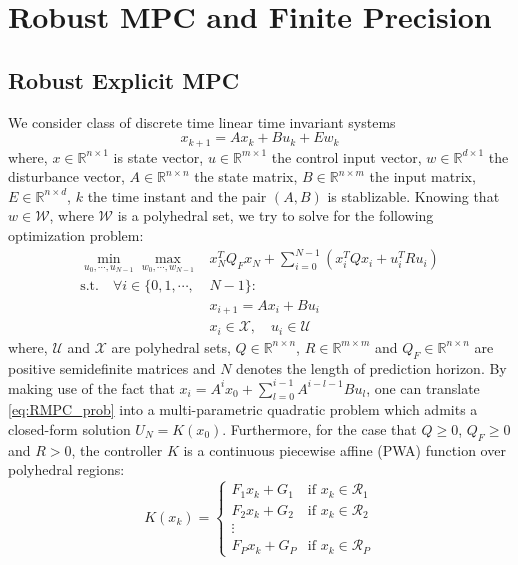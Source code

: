 \section{Robust MPC and Finite Precision}
\subsection{Robust Explicit MPC}
\def\reals{\mathbb{R}}
We consider class of discrete time linear time invariant systems
\begin{equation}
\label{eq:DSS}
x_{k+1}=Ax_k+Bu_k+Ew_k
\end{equation}
where, $x\in \reals^{n\times 1}$ is state vector, $u\in \reals^{m\times 1}$ the control input vector, $w\in \reals^{d\times 1}$ the disturbance vector, $A\in \reals^{n\times n}$ the state matrix, $B\in \reals^{n\times m}$ the input matrix, $E\in \reals^{n\times d}$, $k$ the time instant and the pair $(A,B)$ is stablizable. Knowing that $w\in\mathcal{W}$, where $\mathcal{W}$ is a polyhedral set, we try to solve for the following optimization problem:
\begin{align}
\label{eq:RMPC_prob}
\min_{u_0,\cdots,u_{N-1}}\max_{w_0,\cdots,w_{N-1}}& x_N^TQ_Fx_N+\sum_{i=0}^{N-1}(x_i^TQx_i+u_i^TRu_i)\nonumber\\
\text{s.t.}\quad\forall i\in\{0,1,\cdots,&N-1\}:\nonumber\\
&x_{i+1}=Ax_i+Bu_i\nonumber\\
&x_i\in\mathcal{X},\quad u_i\in \mathcal{U}	
\end{align}
where, $\mathcal U$ and $\mathcal X$ are polyhedral sets, $Q\in\reals^{n\times n}$, $R\in\reals^{m\times m}$ and $Q_F\in\reals^{n\times n}$ are positive semidefinite matrices and $N$ denotes the length of prediction horizon. By making use of the fact that $x_i=A^ix_0+\sum_{l=0}^{i-1}A^{i-l-1}Bu_l$, one can translate \eqref{eq:RMPC_prob} into a multi-parametric quadratic problem which admits a closed-form solution $U_N=K(x_0)$. Furthermore, for the case that $Q\geq0$, $Q_F\geq0$ and $R>0$, the controller $K$ is a continuous piecewise affine (PWA) function over polyhedral regions:
\begin{equation}
K(x_k)=
\begin{cases}
F_1x_k+G_1 & \text{if $x_k\in \mathcal{R}_1$}\\
F_2x_k+G_2 & \text{if $x_k\in \mathcal{R}_2$}\\
\vdots\\
F_Px_k+G_P & \text{if $x_k\in \mathcal{R}_P$}
\end{cases} 
\end{equation}
